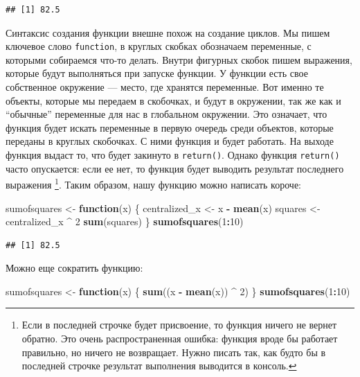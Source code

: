 \documentclass[]{book}
\newenvironment{Shaded}{\begin{snugshade}}{\end{snugshade}}
\newcommand{\KeywordTok}[1]{\textcolor[rgb]{0.13,0.29,0.53}{\textbf{#1}}}
\newcommand{\DecValTok}[1]{\textcolor[rgb]{0.00,0.00,0.81}{#1}}
\newcommand{\StringTok}[1]{\textcolor[rgb]{0.31,0.60,0.02}{#1}}
\newcommand{\ControlFlowTok}[1]{\textcolor[rgb]{0.13,0.29,0.53}{\textbf{#1}}}
\newcommand{\OperatorTok}[1]{\textcolor[rgb]{0.81,0.36,0.00}{\textbf{#1}}}
\newcommand{\NormalTok}[1]{#1}
\begin{document}
\begin{verbatim}
## [1] 82.5
\end{verbatim}

Синтаксис создания функции внешне похож на создание циклов. Мы пишем
ключевое слово \texttt{function}, в круглых скобках обозначаем
переменные, с которыми собираемся что-то делать. Внутри фигурных скобок
пишем выражения, которые будут выполняться при запуске функции. У
функции есть свое собственное окружение --- место, где хранятся
переменные. Вот именно те объекты, которые мы передаем в скобочках, и
будут в окружении, так же как и ``обычные'' переменные для нас в
глобальном окружении. Это означает, что функция будет искать переменные
в первую очередь среди объектов, которые переданы в круглых скобочках. С
ними функция и будет работать. На выходе функция выдаст то, что будет
закинуто в \texttt{return()}. Однако функция \texttt{return()} часто
опускается: если ее нет, то функция будет выводить результат последнего
выражения \footnote{Если в последней строчке будет присвоение, то
  функция ничего не вернет обратно. Это очень распространенная ошибка:
  функция вроде бы работает правильно, но ничего не возвращает. Нужно
  писать так, как будто бы в последней строчке результат выполнения
  выводится в консоль.}. Таким образом, нашу функцию можно написать
короче:

\begin{Shaded}
\begin{Highlighting}[]
\NormalTok{sumofsquares <-}\StringTok{ }\ControlFlowTok{function}\NormalTok{(x) \{}
\NormalTok{  centralized_x <-}\StringTok{ }\NormalTok{x }\OperatorTok{-}\StringTok{ }\KeywordTok{mean}\NormalTok{(x)}
\NormalTok{  squares <-}\StringTok{ }\NormalTok{centralized_x }\OperatorTok{^}\StringTok{ }\DecValTok{2}
  \KeywordTok{sum}\NormalTok{(squares)}
\NormalTok{\}}
\KeywordTok{sumofsquares}\NormalTok{(}\DecValTok{1}\OperatorTok{:}\DecValTok{10}\NormalTok{)}
\end{Highlighting}
\end{Shaded}

\begin{verbatim}
## [1] 82.5
\end{verbatim}

Можно еще сократить функцию:

\begin{Shaded}
\begin{Highlighting}[]
\NormalTok{sumofsquares <-}\StringTok{ }\ControlFlowTok{function}\NormalTok{(x) \{}
  \KeywordTok{sum}\NormalTok{((x }\OperatorTok{-}\StringTok{ }\KeywordTok{mean}\NormalTok{(x)) }\OperatorTok{^}\StringTok{ }\DecValTok{2}\NormalTok{)}
\NormalTok{\}}
\KeywordTok{sumofsquares}\NormalTok{(}\DecValTok{1}\OperatorTok{:}\DecValTok{10}\NormalTok{)}
\end{Highlighting}
\end{Shaded}
\end{document}
